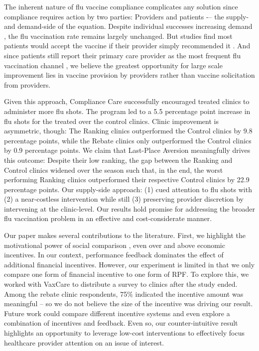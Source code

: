 \begin{onehalfspace}
 The inherent nature of flu vaccine compliance complicates any solution since compliance requires action by two parties: Providers and patients -– the supply- and demand-side of the equation. Despite individual successes increasing demand \citep[e.g.,][]{Milkman2011}, the flu vaccination rate remains largely unchanged. But studies find most patients would accept the vaccine if their provider simply recommended it \citep{Patel2017}. And since patients still report their primary care provider as the most frequent flu vaccination channel \citep[48\%, per][]{CVSHealth2018}, we believe the greatest opportunity for large scale improvement lies in vaccine provision by providers rather than vaccine solicitation from providers. 
 
 Given this approach, Compliance Care successfully encouraged treated clinics to administer more flu shots. The program led to a 5.5 percentage point increase in flu shots for the treated over the control clinics. Clinic improvement is asymmetric, though: The Ranking clinics outperformed the Control clinics by 9.8 percentage points, while the Rebate clinics only outperformed the Control clinics by 0.9 percentage points. We claim that Last-Place Aversion meaningfully drives this outcome: Despite their low ranking, the gap between the Ranking and Control clinics widened over the season such that, in the end, the worst performing Ranking clinics outperformed their respective Control clinics by 22.9 percentage points. Our supply-side approach: (1) cued attention to flu shots with (2) a near-costless intervention while still (3) preserving provider discretion by intervening at the clinic-level. Our results hold promise for addressing the broader flu vaccination problem in an effective and cost-considerate manner.
 
 Our paper makes several contributions to the literature. First, we highlight the motivational power of social comparison \citep{Festinger1954}, even over and above economic incentives. In our context, performance feedback dominates the effect of additional financial incentives. However, our experiment is limited in that we only compare one form of financial incentive to one form of RPF. To explore this, we worked with VaxCare to distribute a survey to clinics after the study ended. Among the rebate clinic respondents, 75\% indicated the incentive amount was meaningful – so we do not believe the size of the incentive was driving our result. Future work could compare different incentive systems and even explore a combination of incentives and feedback. Even so, our counter-intuitive result highlights an opportunity to leverage low-cost interventions to effectively focus healthcare provider attention on an issue of interest. 
 

\end{onehalfspace}
